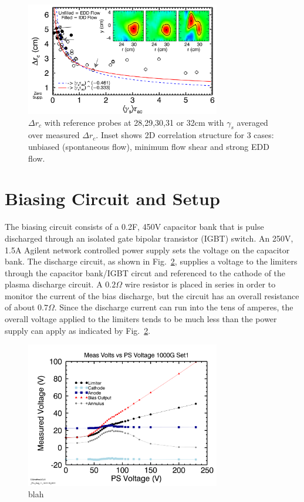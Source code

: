 \documentclass[aip,pop,amsmath,amssymb,reprint,superscriptaddress]{revtex4-1} %
\begin{document}
\begin{figure}[!htbp]
\centerline{
\includegraphics[width=8.5cm]{radcorr}}
\caption{\label{fig:radcorr} $\Delta r_{c}$ with
  reference probes at 28,29,30,31 or 32cm with $\gamma_{s}$ averaged over measured $\Delta r_{c}$.  Inset shows 2D correlation
  structure for 3 cases: unbiased (spontaneous flow), minimum flow
  shear and strong EDD flow.}
\end{figure}

\section{Biasing Circuit and Setup}

The biasing circuit consists of a 0.2F, 450V capacitor bank that is pulse discharged through an isolated gate bipolar transistor (IGBT) switch. An 250V, 1.5A Agilent network controlled power supply sets the voltage on the capacitor bank. The discharge circuit, as shown in Fig.~\ref{fig:VbyBias}, supplies a voltage to the limiters through the capacitor bank/IGBT circut and referenced to the cathode of the plasma discharge circuit. A $0.2 \Omega$ wire resistor is placed in series in order to monitor the current of the bias discharge, but the circuit has an overall resistance of about $0.7 \Omega$. Since the discharge current can run into the tens of amperes, the overall voltage applied to the limiters tends to be much less than the power supply can apply as indicated by Fig.~\ref{fig:VbyBias}. 

\begin{figure}[!htbp]
\centerline{
\includegraphics[width=8.5cm]{VbyBias}}
\caption{\label{fig:VbyBias} blah}
\end{figure}
\end{document}

